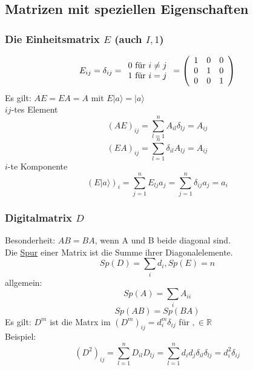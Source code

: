 \documentclass{article}
\begin{document}
\subsection{Matrizen mit speziellen Eigenschaften}
\subsubsection{Die Einheitsmatrix $E$ (auch $I, 1$)}
\begin{equation*}
    E_{ij}=\delta_{ij}=\begin{array}{c}
        0 \text{ für } i \neq j\\1 \text{ für } i=j
    \end{array} = \left(\begin{array}{c c c}
        1&0&0\\0&1&0\\0&0&1
    \end{array}\right)
\end{equation*}
Es gilt: $AE = EA = A$ mit $E|a\rangle = |a\rangle$\\
$ij$-tes Element
\begin{equation*}
    (AE)_{ij}=\sum_{l=1}^{n}A_{il}\delta_{lj}=A_{ij}
\end{equation*}
\begin{equation*}
    (EA)_{ij}=\sum_{l=1}^{n}\delta_{il}A_{lj}=A_{ij}
\end{equation*}
$i$-te Komponente
\begin{equation*}
    (E|a\rangle)_i = \sum_{j=1}^{n} E_{lj}a_j = \sum_{j=1}^{n}\delta_{ij}a_j=a_i
\end{equation*}
\subsubsection{Digitalmatrix $D$}
Besonderheit: $AB =BA$, wenn A und B beide diagonal sind.\\
Die \underline{Spur} einer Matrix ist die Summe ihrer Diagonalelemente.
\begin{equation*}
    Sp(D) = \sum_{i}d_i, Sp(E) = n
\end{equation*}
allgemein:
\begin{equation*}
    Sp(A)=\sum_{i} A_{ii}
\end{equation*}
\begin{equation*}
    Sp(AB) = Sp(BA)
\end{equation*}
Es gilt: $D^m$ ist die Matrx im $(D^m)_{ij} = d_i^m\delta_{ij}$ für $, \in \mathbb{R}$\\
Beispiel:
\begin{equation*}
    (D^2)_{ij} = \sum_{l=1}^{n}D_{il}D_{lj}=\sum_{l=1}^{n}d_id_j\delta_{il}\delta_{lj}=d^2_i\delta_{ij}
\end{equation*}
\end{document}
